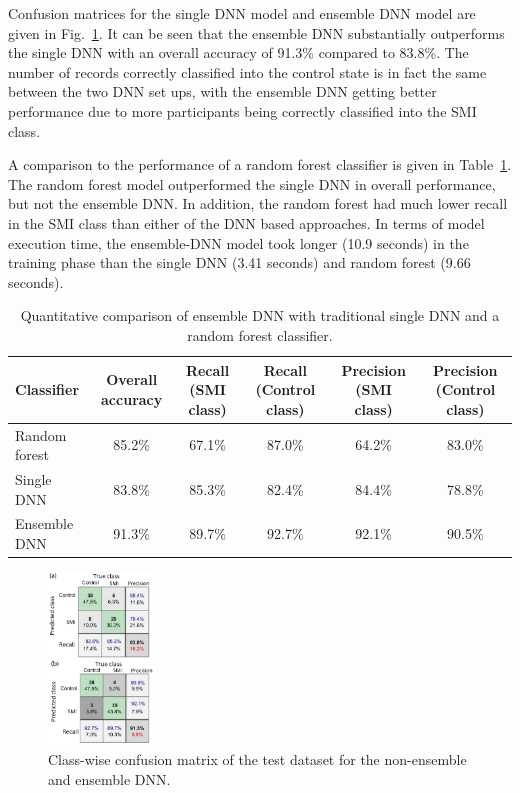\documentclass[letterpaper, 10pt, conference]{ieeeconf} %
\newcommand{\fig}[1]{Fig.~\ref{#1}}
\newcommand{\tab}[1]{Table~\ref{#1}}
\newcommand{\otoprule}{\midrule[\heavyrulewidth]}
\begin{document}
Confusion matrices for the single DNN model and ensemble DNN model are given in \fig{fig:confusionmatrix}. It can be seen that the ensemble DNN substantially outperforms the single DNN with an overall accuracy of 91.3\% compared to 83.8\%. The number of records correctly classified into the control state is in fact the same between the two DNN set ups, with the ensemble DNN getting better performance due to more participants being correctly classified into the SMI class.

A comparison to the performance of a random forest classifier is given in \tab{table:performance_comparison}. The random forest model outperformed the single DNN in overall performance, but not the ensemble DNN. In addition, the random forest had much lower recall in the SMI class than either of the DNN based approaches. In terms of model execution time, the ensemble-DNN model took longer (10.9 seconds) in the training phase than the single DNN (3.41 seconds) and random forest (9.66 seconds). 
\begin{table}
\centering
\caption{Quantitative comparison of ensemble DNN with traditional single DNN and a random forest classifier.}   \label{table:performance_comparison}
 \begin{tabular}{lccccc}
    \toprule
    Classifier &  Overall accuracy & Recall (SMI class) & Recall (Control class) & Precision (SMI class) & Precision (Control class) \\
    \otoprule
          Random forest &  85.2\%  & 67.1\%  & 87.0\%& 64.2\%& 83.0\%\\
     \midrule
    
     Single DNN &   83.8\% & 85.3\% &82.4\%& 84.4\%&78.8\%\\
     Ensemble DNN  &  91.3\% & 89.7\%& 92.7\% & 92.1\%&90.5\%\\
     
    \bottomrule
  \end{tabular}
\end{table} 

\begin{figure}
  \centering
  \includegraphics[width=0.25\textwidth]{images/confusion_matrix2.png}
  \caption{Class-wise confusion matrix of the test dataset for the non-ensemble and ensemble DNN.}
  \label{fig:confusionmatrix}
\end{figure}
\end{document}
